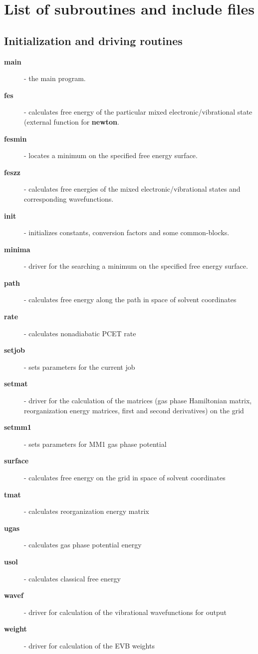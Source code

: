 \documentclass[oneside,11pt,openany]{book}
\newcommand{\tw}{\ttfamily}
\begin{document}
\chapter{List of subroutines and include files}
%
\section{Initialization and driving routines}
\begin{description}
\item[{\tw\bf main}] - the main program.
\item[{\tw\bf fes}] - calculates free energy of the particular mixed
                   electronic/vibrational state (external
                   function for {\tw\bf newton}.
\item[{\tw\bf fesmin}] - locates a minimum on
                      the specified free energy surface.
\item[{\tw\bf feszz}] - calculates free energies of the mixed
                   electronic/vibrational states and corresponding
                   wavefunctions.
\item[{\tw\bf init}] - initializes constants, conversion factors
                    and some common-blocks.
\item[{\tw\bf minima}] - driver for the searching a minimum on
                      the specified free energy surface.
\item[{\tw\bf path}] - calculates free energy along the path
                    in space of solvent coordinates
\item[{\tw\bf rate}] - calculates nonadiabatic PCET rate
\item[{\tw\bf setjob}] - sets parameters for the current job
\item[{\tw\bf setmat}] - driver for the calculation of the matrices
                     (gas phase Hamiltonian matrix, reorganization
                      energy matrices, first and second derivatives)
                      on the grid
\item[{\tw\bf setmm1}] - sets parameters for MM1 gas phase potential
\item[{\tw\bf surface}] - calculates free energy on the grid
                       in space of solvent coordinates
\item[{\tw\bf tmat}] - calculates reorganization energy matrix
\item[{\tw\bf ugas}] - calculates gas phase potential energy
\item[{\tw\bf usol}] - calculates classical free energy
\item[{\tw\bf wavef}] - driver for calculation of the vibrational
                     wavefunctions for output
\item[{\tw\bf weight}] - driver for calculation of the EVB weights
\end{description}
\end{document}
